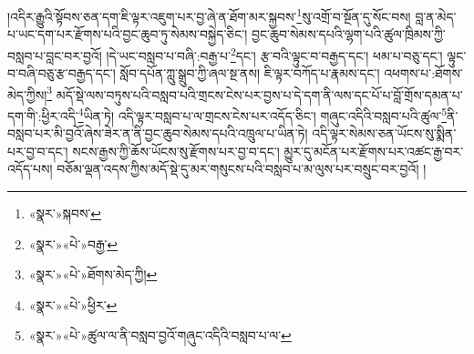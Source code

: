 །འདིར་རྒྱུའི་སྟོབས་ཅན་དག་ཇི་ལྟར་འཇུག་པར་བྱ་ཞེ་ན་ཐོག་མར་སྐྱབས་\footnote{«སྣར་»སྐབས་}སུ་འགྲོ་བ་སྔོན་དུ་སོང་བས། བླ་ན་མེད་པ་ཡང་དག་པར་རྫོགས་པའི་བྱང་ཆུབ་ཏུ་སེམས་བསྐྱེད་ཅིང་། བྱང་ཆུབ་སེམས་དཔའི་ལྷག་པའི་ཚུལ་ཁྲིམས་ཀྱི་བསླབ་པ་བླང་བར་བྱའོ། །དེ་ཡང་བསླབ་པ་བཞི་:བརྒྱ་པ་\footnote{«སྣར་»«པེ་»བརྒྱ་}དང་། རྩ་བའི་ལྟུང་བ་བརྒྱད་དང་། ཕམ་པ་བཅུ་དང་། ལྟུང་བ་བཞི་བཅུ་རྩ་བརྒྱད་དང་། སློབ་དཔོན་ཀླུ་སྒྲུབ་ཀྱི་ཞལ་སྔ་ནས། ཇི་ལྟར་བཀོད་པ་རྣམས་དང་། འཕགས་པ་:ཐོགས་མེད་ཀྱིས།\footnote{«སྣར་»«པེ་»ཐོགས་མེད་ཀྱི།} མདོ་སྡེ་ལས་བཏུས་པའི་བསླབ་པའི་གྲངས་ངེས་པར་བྱས་པ་དེ་དག་ནི་ལས་དང་པོ་པ་བློ་གྲོས་དམན་པ་དག་གི་:ཕྱིར་འདི་\footnote{«སྣར་»«པེ་»ཕྱིར་}ཡིན་ཏེ། འདི་ལྟར་བསླབ་པ་ལ་གྲངས་ངེས་པར་འདོད་ཅིང་། གཞུང་འདིའི་བསླབ་པའི་ཚུལ་\footnote{«སྣར་»«པེ་»ཚུལ་ལ་ནི་བསླབ་བྱའོ་གཞུང་འདིའི་བསླབ་པ་ལ་}ནི་བསླབ་པར་མི་བྱའོ་ཞེས་ཟེར་ན་ནི་བྱང་ཆུབ་སེམས་དཔའི་འཁྲུལ་པ་ཡིན་ཏེ། འདི་ལྟར་སེམས་ཅན་ཡོངས་སུ་སྨིན་པར་བྱ་བ་དང་། སངས་རྒྱས་ཀྱི་ཆོས་ཡོངས་སུ་རྫོགས་པར་བྱ་བ་དང་། མྱུར་དུ་མངོན་པར་རྫོགས་པར་འཚང་རྒྱ་བར་འདོད་པས། བཅོམ་ལྡན་འདས་ཀྱིས་མདོ་སྡེ་དུ་མར་གསུངས་པའི་བསླབ་པ་མ་ལུས་པར་བསྲུང་བར་བྱའོ། །
